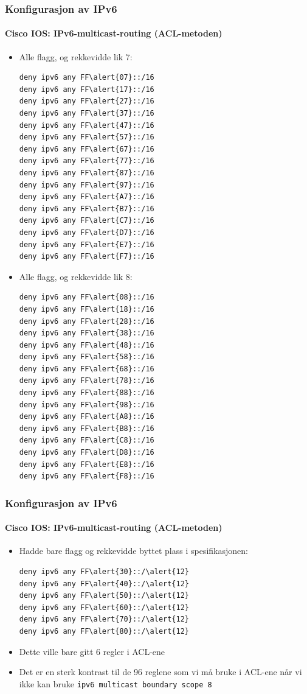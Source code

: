 \begin{frame}[fragile]%
  \frametitle{Konfigurasjon av IPv6}
  \framesubtitle{Cisco IOS: IPv6-multicast-routing (ACL-metoden)}
  \begin{multicols}{2}
    \begin{itemize}%
    \item Alle flagg, og rekkevidde lik 7:
\begin{Verbatim}[commandchars=\\\{\},fontsize=\scriptsize]
deny ipv6 any FF\alert{07}::/16
deny ipv6 any FF\alert{17}::/16
deny ipv6 any FF\alert{27}::/16
deny ipv6 any FF\alert{37}::/16
deny ipv6 any FF\alert{47}::/16
deny ipv6 any FF\alert{57}::/16
deny ipv6 any FF\alert{67}::/16
deny ipv6 any FF\alert{77}::/16
deny ipv6 any FF\alert{87}::/16
deny ipv6 any FF\alert{97}::/16
deny ipv6 any FF\alert{A7}::/16
deny ipv6 any FF\alert{B7}::/16
deny ipv6 any FF\alert{C7}::/16
deny ipv6 any FF\alert{D7}::/16
deny ipv6 any FF\alert{E7}::/16
deny ipv6 any FF\alert{F7}::/16
\end{Verbatim}
    \item Alle flagg, og rekkevidde lik 8:
\begin{Verbatim}[commandchars=\\\{\},fontsize=\scriptsize]
deny ipv6 any FF\alert{08}::/16
deny ipv6 any FF\alert{18}::/16
deny ipv6 any FF\alert{28}::/16
deny ipv6 any FF\alert{38}::/16
deny ipv6 any FF\alert{48}::/16
deny ipv6 any FF\alert{58}::/16
deny ipv6 any FF\alert{68}::/16
deny ipv6 any FF\alert{78}::/16
deny ipv6 any FF\alert{88}::/16
deny ipv6 any FF\alert{98}::/16
deny ipv6 any FF\alert{A8}::/16
deny ipv6 any FF\alert{B8}::/16
deny ipv6 any FF\alert{C8}::/16
deny ipv6 any FF\alert{D8}::/16
deny ipv6 any FF\alert{E8}::/16
deny ipv6 any FF\alert{F8}::/16
\end{Verbatim}
    \end{itemize}
  \end{multicols}
\end{frame}

\begin{frame}[fragile]%
  \frametitle{Konfigurasjon av IPv6}
  \framesubtitle{Cisco IOS: IPv6-multicast-routing (ACL-metoden)}
  \begin{itemize}%
    \item Hadde bare flagg og rekkevidde byttet plass i spesifikasjonen:
\begin{Verbatim}[commandchars=\\\{\}]
deny ipv6 any FF\alert{30}::/\alert{12}
deny ipv6 any FF\alert{40}::/\alert{12}
deny ipv6 any FF\alert{50}::/\alert{12}
deny ipv6 any FF\alert{60}::/\alert{12}
deny ipv6 any FF\alert{70}::/\alert{12}
deny ipv6 any FF\alert{80}::/\alert{12}
\end{Verbatim}
    \item Dette ville bare gitt 6 regler i ACL-ene
    \item Det er en sterk kontrast til de 96 reglene som vi må bruke i
      ACL-ene når vi ikke kan bruke \texttt{ipv6 multicast boundary
        scope 8}
  \end{itemize}
\end{frame}

